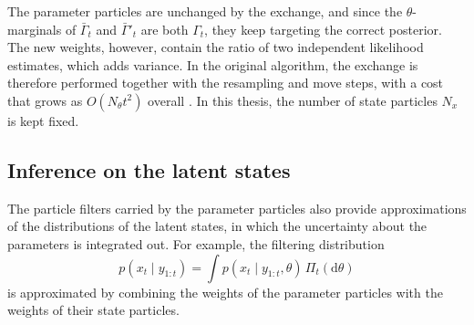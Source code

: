 The parameter particles are unchanged by the exchange, and since the $\theta$-marginals of $\bar{\Gamma}_t$ and $\bar{\Gamma}'_t$ are both $\Gamma_t$, they keep targeting the correct posterior. The new weights, however, contain the ratio of two independent likelihood estimates, which adds variance. In the original algorithm, the exchange is therefore performed together with the resampling and move steps, with a cost that grows as $O(N_\theta t^2)$ overall \cite{chopin2013smc2}. In this thesis, the number of state particles $N_x$ is kept fixed.

\subsection{Inference on the latent states}
\label{sec:smc2_states}
The particle filters carried by the parameter particles also provide approximations of the distributions of the latent states, in which the uncertainty about the parameters is integrated out. For example, the filtering distribution
\begin{equation}
    p(x_t\mid y_{1:t}) = \int p(x_t\mid y_{1:t},\theta)\,\Pi_t(\mathrm{d}\theta)
\end{equation}
is approximated by combining the weights of the parameter particles with the weights of their state particles.

